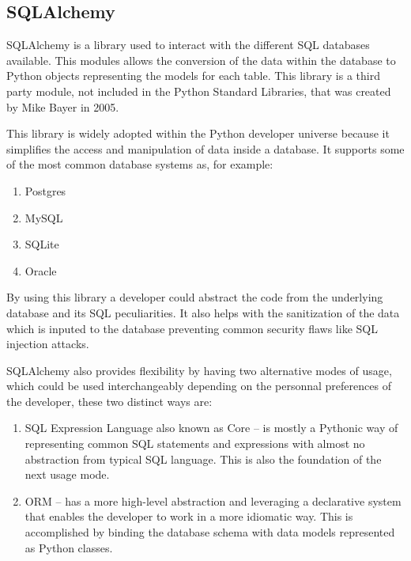 
\subsection{SQLAlchemy}
\label{chap3:sec:tools:sub:sqlalcemy}
SQLAlchemy is a library used to interact with the different SQL databases
available. This modules allows the conversion of the data within the database to
Python objects representing the models for each table. This library is a third
party module, not included in the Python Standard Libraries, that was created by
Mike Bayer in 2005.

This library is widely adopted within the Python developer universe because it
simplifies the access and manipulation of data inside a database. It supports
some of the most common database systems as, for example:
\begin{enumerate}
	\item Postgres
	\item MySQL
	\item SQLite
	\item Oracle
\end{enumerate}
By using this library a developer could abstract the code from the underlying
database and its SQL peculiarities. It also helps with the sanitization of the
data which is inputed to the database preventing common security flaws like SQL
injection attacks.

SQLAlchemy also provides flexibility by having two alternative modes of usage,
which could be used interchangeably depending on the personnal preferences of
the developer, these two distinct ways are:
\begin{enumerate}
	\item SQL Expression Language also known as Core -- is mostly a Pythonic way
		of representing common SQL statements and expressions with almost no
		abstraction from typical SQL language. This is also the foundation of
		the next usage mode.
	\item ORM -- has a more high-level abstraction and leveraging a declarative
		system that enables the developer to work in a more idiomatic way. This
		is accomplished by binding the database schema with data models
		represented as Python classes.
\end{enumerate}


